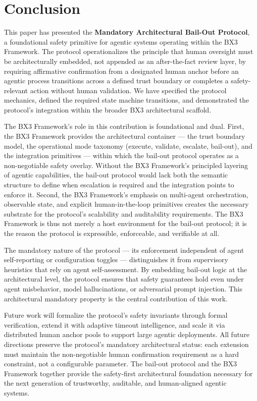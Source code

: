 \section{Conclusion}
\label{sec:conclusion}

This paper has presented the \textbf{Mandatory Architectural Bail-Out Protocol},
a foundational safety primitive for agentic systems operating within the BX3
Framework. The protocol operationalizes the principle that human oversight must
be architecturally embedded, not appended as an after-the-fact review layer,
by requiring affirmative confirmation from a designated human anchor before an
agentic process transitions across a defined trust boundary or completes a
safety-relevant action without human validation. We have specified the protocol
mechanics, defined the required state machine transitions, and demonstrated
the protocol's integration within the broader BX3 architectural scaffold.

The BX3 Framework's role in this contribution is foundational and dual. First,
the BX3 Framework provides the architectural container — the trust boundary
model, the operational mode taxonomy (execute, validate, escalate, bail-out),
and the integration primitives — within which the bail-out protocol operates
as a non-negotiable safety overlay. Without the BX3 Framework's principled
layering of agentic capabilities, the bail-out protocol would lack both the
semantic structure to define when escalation is required and the integration
points to enforce it. Second, the BX3 Framework's emphasis on multi-agent
orchestration, observable state, and explicit human-in-the-loop primitives
creates the necessary substrate for the protocol's scalability and auditability
requirements. The BX3 Framework is thus not merely a host environment for the
bail-out protocol; it is the reason the protocol is expressible, enforceable, and
verifiable at all.

The mandatory nature of the protocol — its enforcement independent of
agent self-reporting or configuration toggles — distinguishes it from
supervisory heuristics that rely on agent self-assessment. By embedding
bail-out logic at the architectural level, the protocol ensures that safety
guarantees hold even under agent misbehavior, model hallucinations, or
adversarial prompt injection. This architectural mandatory property is the
central contribution of this work.

Future work will formalize the protocol's safety invariants through
formal verification, extend it with adaptive timeout intelligence, and
scale it via distributed human anchor pools to support large agentic
deployments. All future directions preserve the protocol's mandatory
architectural status: each extension must maintain the non-negotiable
human confirmation requirement as a hard constraint, not a configurable
parameter. The bail-out protocol and the BX3 Framework together provide
the safety-first architectural foundation necessary for the next generation
of trustworthy, auditable, and human-aligned agentic systems.
